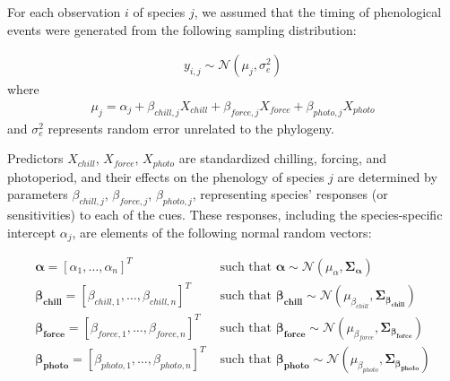 \documentclass[11pt]{article}
\begin{document}
For each observation $i$ of species $j$, we assumed that the timing of phenological events were generated from the following sampling distribution:

\begin{align}
  \label{modely}
  y_{i,j} \sim \mathcal{N}(\mu_j, \sigma_e^2)
\end{align}
where
\begin{align}
  \label{modelmu}
  \mu_j = \alpha_j + \beta_{chill,j} X_{chill} + \beta_{force,j} X_{force} + \beta_{photo,j} X_{photo}
\end{align}
and $\sigma_e^2$ represents random error unrelated to the phylogeny. 

Predictors $X_{chill}$, $X_{force}$, $X_{photo}$ are standardized chilling, forcing, and photoperiod, and their effects on the phenology of species $j$ are determined by parameters $\beta_{chill,j}$, $\beta_{force,j}$, $\beta_{photo,j}$, representing species' responses (or sensitivities) to each of the cues. These responses, including the species-specific intercept $\alpha_j$, are elements of the following normal random vectors:

\begin{align}
    \label{phybetas}
  \boldsymbol{\alpha} = [\alpha_1, \ldots, \alpha_n]^T & \text{ such that }
  \boldsymbol{\alpha} \sim \mathcal{N}(\mu_{\alpha},\boldsymbol{\Sigma_{\alpha}}) \\
  \boldsymbol{\beta_{chill}} =  [\beta_{chill,1}, \ldots, \beta_{chill,n}]^T & \text{ such that }
  \boldsymbol{\beta_{chill}} \sim \mathcal{N}(\mu_{\beta_{chill}},\boldsymbol{\Sigma_{\beta_{chill}}}) \nonumber \\
  \boldsymbol{\beta_{force}} =  [\beta_{force,1}, \ldots, \beta_{force,n}]^T & \text{ such that }
  \boldsymbol{\beta_{force}} \sim \mathcal{N}(\mu_{\beta_{force}},\boldsymbol{\Sigma_{\beta_{force}}}) \nonumber \\
  \boldsymbol{\beta_{photo}} =  [\beta_{photo,1}, \ldots, \beta_{photo,n}]^T & \text{ such that }
  \boldsymbol{\beta_{photo}} \sim \mathcal{N}(\mu_{\beta_{photo}},\boldsymbol{\Sigma_{\beta_{photo}}}) \nonumber
\end{align}
\end{document}
